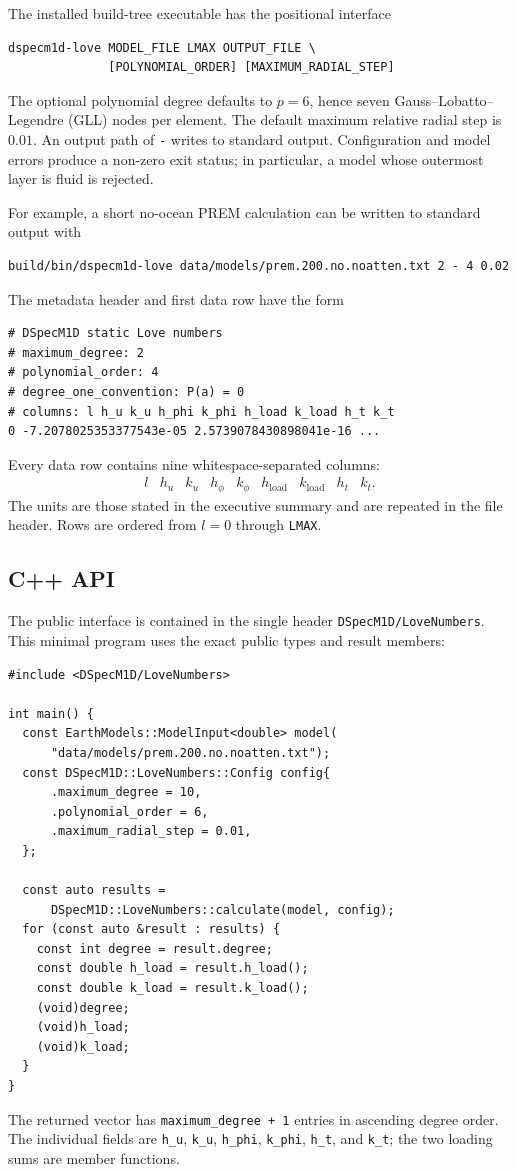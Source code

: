 \documentclass[11pt,a4paper]{article}
\newcommand{\code}[1]{\texttt{#1}}
\begin{document}
The installed build-tree executable has the positional interface
\begin{verbatim}
dspecm1d-love MODEL_FILE LMAX OUTPUT_FILE \
              [POLYNOMIAL_ORDER] [MAXIMUM_RADIAL_STEP]
\end{verbatim}
The optional polynomial degree defaults to \(p=6\), hence seven
Gauss--Lobatto--Legendre (GLL) nodes per element.  The default maximum
relative radial step is \(0.01\).  An output path of \code{-} writes to
standard output.  Configuration and model errors produce a non-zero exit
status; in particular, a model whose outermost layer is fluid is rejected.

For example, a short no-ocean PREM calculation can be written to standard
output with
\begin{verbatim}
build/bin/dspecm1d-love data/models/prem.200.no.noatten.txt 2 - 4 0.02
\end{verbatim}
The metadata header and first data row have the form
\begin{verbatim}
# DSpecM1D static Love numbers
# maximum_degree: 2
# polynomial_order: 4
# degree_one_convention: P(a) = 0
# columns: l h_u k_u h_phi k_phi h_load k_load h_t k_t
0 -7.2078025353377543e-05 2.5739078430898041e-16 ...
\end{verbatim}
Every data row contains nine whitespace-separated columns:
\[
\begin{array}{c|cccccccc}
l&h_u&k_u&h_\phi&k_\phi&h_{\mathrm{load}}&
k_{\mathrm{load}}&h_t&k_t .
\end{array}
\]
The units are those stated in the executive summary and are repeated in the
file header.  Rows are ordered from \(l=0\) through \code{LMAX}.

\subsection{C++ API}

The public interface is contained in the single header
\code{DSpecM1D/LoveNumbers}.  This minimal program uses the exact public
types and result members:
\begin{verbatim}
#include <DSpecM1D/LoveNumbers>

int main() {
  const EarthModels::ModelInput<double> model(
      "data/models/prem.200.no.noatten.txt");
  const DSpecM1D::LoveNumbers::Config config{
      .maximum_degree = 10,
      .polynomial_order = 6,
      .maximum_radial_step = 0.01,
  };

  const auto results =
      DSpecM1D::LoveNumbers::calculate(model, config);
  for (const auto &result : results) {
    const int degree = result.degree;
    const double h_load = result.h_load();
    const double k_load = result.k_load();
    (void)degree;
    (void)h_load;
    (void)k_load;
  }
}
\end{verbatim}
The returned vector has \code{maximum\_degree + 1} entries in ascending
degree order.  The individual fields are \code{h\_u}, \code{k\_u},
\code{h\_phi}, \code{k\_phi}, \code{h\_t}, and \code{k\_t}; the two loading
sums are member functions.
\end{document}
